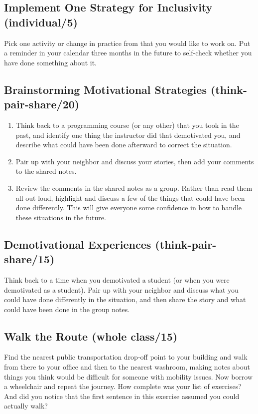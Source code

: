 \subsection*{Implement One Strategy for Inclusivity (individual/5)}

Pick one activity or change in practice from \cite{Lee2017} that you
would like to work on. Put a reminder in your calendar three months in
the future to self-check whether you have done something about it.

\subsection*{Brainstorming Motivational Strategies (think-pair-share/20)}

\begin{enumerate}
\item
  Think back to a programming course (or any other) that you took in
  the past, and identify one thing the instructor did that demotivated
  you, and describe what could have been done afterward to correct the
  situation.
\item
  Pair up with your neighbor and discuss your stories, then add your
  comments to the shared notes.
\item
  Review the comments in the shared notes as a group. Rather than read
  them all out loud, highlight and discuss a few of the things that
  could have been done differently. This will give everyone some
  confidence in how to handle these situations in the future.
\end{enumerate}

\subsection*{Demotivational Experiences (think-pair-share/15)}

Think back to a time when you demotivated a student (or when you were
demotivated as a student). Pair up with your neighbor and discuss what
you could have done differently in the situation, and then share the
story and what could have been done in the group notes.

\subsection*{Walk the Route (whole class/15)}

Find the nearest public transportation drop-off point to your building
and walk from there to your office and then to the nearest washroom,
making notes about things you think would be difficult for someone with
mobility issues. Now borrow a wheelchair and repeat the journey. How
complete was your list of exercises? And did you notice that the first
sentence in this exercise assumed you could actually walk?

